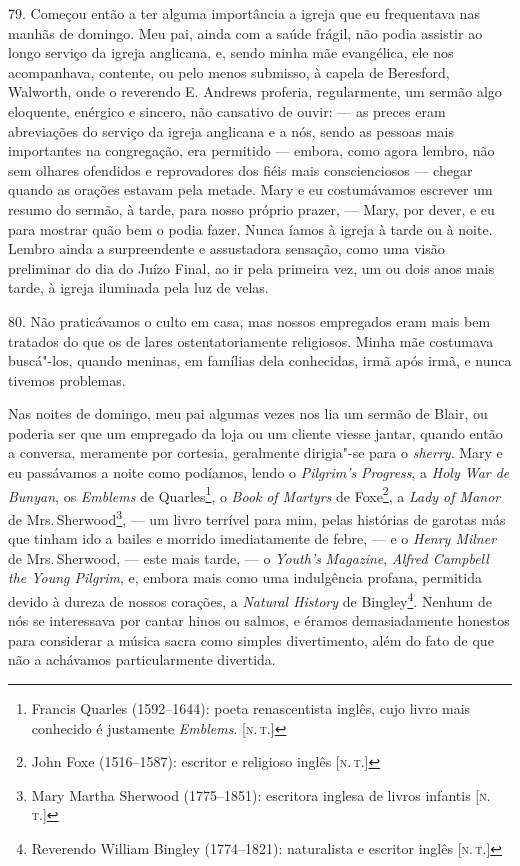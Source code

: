 79. Começou então a ter alguma importância a igreja que eu frequentava
nas manhãs de domingo. Meu pai, ainda com a saúde frágil, não podia
assistir ao longo serviço da igreja anglicana, e, sendo minha mãe
evangélica, ele nos acompanhava, contente, ou pelo menos submisso, à
capela de Beresford, Walworth, onde o reverendo E. Andrews proferia,
regularmente, um sermão algo eloquente, enérgico e sincero, não
cansativo de ouvir: --- as preces eram abreviações do serviço da igreja
anglicana e a nós, sendo as pessoas mais importantes na congregação, era
permitido --- embora, como agora lembro, não sem olhares ofendidos e
reprovadores dos fiéis mais conscienciosos --- chegar quando as orações
estavam pela metade. Mary e eu costumávamos escrever um resumo do
sermão, à tarde, para nosso próprio prazer, --- Mary, por dever, e eu
para mostrar quão bem o podia fazer. Nunca íamos à igreja à tarde ou à
noite. Lembro ainda a surpreendente e assustadora sensação, como uma
visão preliminar do dia do Juízo Final, ao ir pela primeira vez, um ou
dois anos mais tarde, à igreja iluminada pela luz de velas.

80. Não praticávamos o culto em casa, mas nossos empregados eram mais
bem tratados do que os de lares ostentatoriamente religiosos. Minha mãe
costumava buscá"-los, quando meninas, em famílias dela conhecidas, irmã
após irmã, e nunca tivemos problemas.

Nas noites de domingo, meu pai algumas vezes nos lia um sermão de Blair,
ou poderia ser que um empregado da loja ou um cliente viesse jantar,
quando então a conversa, meramente por cortesia, geralmente dirigia"-se
para o \emph{sherry}. Mary e eu passávamos a noite como podíamos, lendo
o \emph{Pilgrim's} \emph{Progress}, a \emph{Holy War de Bunyan}, os
\emph{Emblems} de Quarles\footnote{Francis Quarles (1592--1644): poeta
  renascentista inglês, cujo livro mais conhecido é justamente
  \emph{Emblems}. {[}\textsc{n.\,t.}{]}}, o \emph{Book} \emph{of Martyrs} de
Foxe\footnote{John Foxe (1516--1587): escritor e religioso inglês {[}\textsc{n.\,t.}{]}}, a \emph{Lady of Manor} de Mrs.\,Sherwood\footnote{Mary Martha
  Sherwood (1775--1851): escritora inglesa de livros infantis {[}\textsc{n.\,t.}{]}}, --- um livro terrível para mim, pelas histórias de garotas más
que tinham ido a bailes e morrido imediatamente de febre, --- e o
\emph{Henry Milner} de Mrs.\,Sherwood, --- este mais tarde, --- o
\emph{Youth's} \emph{Magazine}, \emph{Alfred Campbell the Young
Pilgrim}, e, embora mais como uma indulgência profana, permitida devido
à dureza de nossos corações, a \emph{Natural History} de
Bingley\footnote{Reverendo William Bingley (1774--1821): naturalista e
  escritor inglês {[}\textsc{n.\,t.}{]}}. Nenhum de nós se interessava por
cantar hinos ou salmos, e éramos demasiadamente honestos para considerar
a música sacra como simples divertimento, além do fato de que não a
achávamos particularmente divertida.

